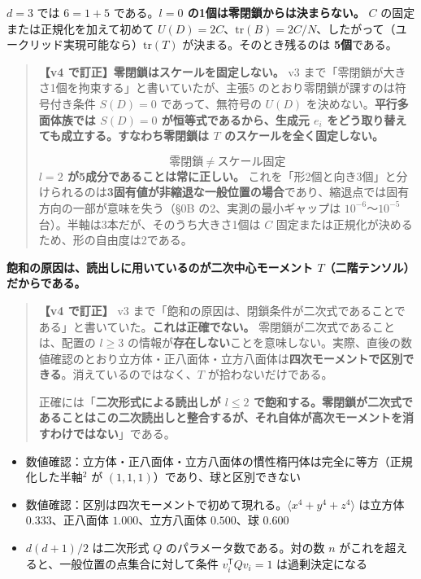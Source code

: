 \documentclass[
  10pt,
]{ltjsarticle}
\providecommand{\tightlist}{%
  \setlength{\itemsep}{0pt}\setlength{\parskip}{0pt}}
\begin{document}
\(d=3\) では \(6 = 1 + 5\) である。\textbf{\(l=0\)
の1個は零閉鎖からは決まらない。} \(C\) の固定または正規化を加えて初めて
\(U(D)=2C\)、\(\mathrm{tr}(B)=2C/N\)、したがって（ユークリッド実現可能なら）\(\mathrm{tr}(T)\)
が決まる。そのとき残るのは \textbf{5個}である。

\begin{quote}
\textbf{【v4 で訂正】零閉鎖はスケールを固定しない。} v3
まで「零閉鎖が大きさ1個を拘束する」と書いていたが、主張5
のとおり零閉鎖が課すのは符号付き条件 \(S(D)=0\) であって、無符号の
\(U(D)\) を決めない。\textbf{平行多面体族では \(S(D)=0\)
が恒等式であるから、生成元 \(e_i\)
をどう取り替えても成立する。すなわち零閉鎖は \(T\)
のスケールを全く固定しない。}

\[\boxed{\ \text{零閉鎖} \ \ne\ \text{スケール固定}\ }\]\textbf{\(l=2\)
が5成分であることは常に正しい。}
これを「形2個と向き3個」と分けられるのは\textbf{3固有値が非縮退な一般位置の場合}であり、縮退点では固有方向の一部が意味を失う（§0B
の2、実測の最小ギャップは \(10^{-6}\)〜\(10^{-5}\)
台）。半軸は3本だが、そのうち大きさ1個は \(C\)
固定または正規化が決めるため、形の自由度は2である。
\end{quote}

\textbf{飽和の原因は、読出しに用いているのが二次中心モーメント
\(T\)（二階テンソル）だからである。}

\begin{quote}
\textbf{【v4 で訂正】} v3
まで「飽和の原因は、閉鎖条件が二次式であることである」と書いていた。\textbf{これは正確でない。}
零閉鎖が二次式であることは、配置の \(l\ge3\)
の情報が\textbf{存在しない}ことを意味しない。実際、直後の数値確認のとおり立方体・正八面体・立方八面体は\textbf{四次モーメントで区別できる}。消えているのではなく、\(T\)
が拾わないだけである。

正確には「\textbf{二次形式による読出しが \(l\le2\)
で飽和する。零閉鎖が二次式であることはこの二次読出しと整合するが、それ自体が高次モーメントを消すわけではない}」である。
\end{quote}

\begin{itemize}
\tightlist
\item
  数値確認：立方体・正八面体・立方八面体の慣性楕円体は完全に等方（正規化した半軸\(^2\)
  が \((1,1,1)\)）であり、球と区別できない
\item
  数値確認：区別は四次モーメントで初めて現れる。\(\langle x^4+y^4+z^4\rangle\)
  は立方体 \(0.333\)、正八面体 \(1.000\)、立方八面体 \(0.500\)、球
  \(0.600\)
\item
  \(d(d+1)/2\) は二次形式 \(Q\) のパラメータ数である。対の数 \(n\)
  がこれを超えると、一般位置の点集合に対して条件
  \(v_i^{\mathsf T}Qv_i = 1\) は過剰決定になる
\end{itemize}
\end{document}
